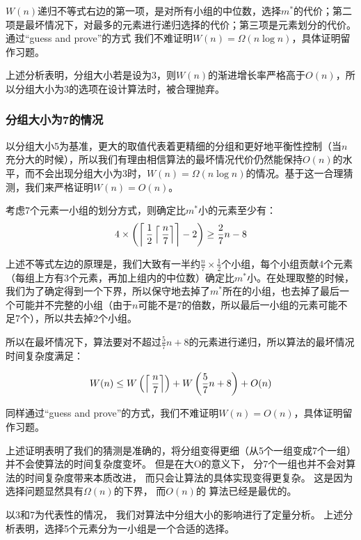 \noindent $W(n)$递归不等式右边的第一项，是对所有小组的中位数，选择$m^*$的代价；第二项是最坏情况下，对最多的元素进行递归选择的代价；第三项是元素划分的代价。
通过“guess and prove”的方式%
我们不难证明$W(n) = \Omega(n\log n)$，具体证明留作习题。

上述分析表明，分组大小若是设为3，则$W(n)$的渐进增长率严格高于$O(n)$，所以分组大小为3的选项在设计算法时，被合理抛弃。

\subsubsection{分组大小为7的情况}

以分组大小5为基准，更大的取值代表着更精细的分组和更好地平衡性控制（当$n$充分大的时候），所以我们有理由相信算法的最坏情况代价仍然能保持$O(n)$的水平，而不会出现分组大小为3时，$W(n) = \Omega(n\log n)$的情况。基于这一合理猜测，我们来严格证明$W(n)=O(n)$。

考虑7个元素一小组的划分方式，则确定比$m^*$小的元素至少有：
\begin{align*}
    4 \times \left(\left \lceil\,\frac{1}{2}\left \lceil\,\frac{n}{7} \right \rceil \right \rceil-2\right) \geq \frac{2}{7}n - 8
\end{align*}

\noindent 上述不等式左边的原理是，我们大致有一半约$\frac{n}{7}\times \frac{1}{2}$个小组，每个小组贡献4个元素（每组上方有3个元素，再加上组内的中位数）确定比$m^*$小。在处理取整的时候，我们为了确定得到一个下界，所以保守地去掉了$m^*$所在的小组，也去掉了最后一个可能并不完整的小组（由于$n$可能不是7的倍数，所以最后一小组的元素可能不足7个），所以共去掉2个小组。

所以在最坏情况下，算法要对不超过$\frac{5}{7}n+8$的元素进行递归，所以算法的最坏情况时间复杂度满足：

\begin{align*}
    W(n) \leq W\left( \left \lceil\,\frac{n}{7} \right \rceil\right) + W\left( \frac{5}{7}n+8\right) + O(n)
\end{align*}

\noindent 同样通过“guess and prove”的方式，我们不难证明$W(n) = O(n)$，具体证明留作习题。

上述证明表明了我们的猜测是准确的，将分组变得更细（从5个一组变成7个一组）并不会使算法的时间复杂度变坏。
但是在大O的意义下，
    分7个一组也并不会对算法的时间复杂度带来本质改进，
    而只会让算法的具体实现变得更复杂。
这是因为选择问题显然具有$\Omega(n)$的下界，%
    而$O(n)$的  算法已经是最优的。

以3和7为代表性的情况，
    我们对算法中分组大小的影响进行了定量分析。
上述分析表明，选择5个元素分为一小组是一个合适的选择。
